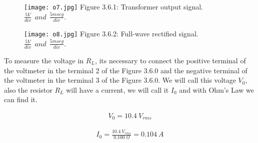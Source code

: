 \begin{multicols}{2}
\begin{figure}[H]
\texttt{[image: o7.jpg]}
\centering \linebreak \linebreak Figure 3.6.1: Transformer output signal.
\linebreak \linebreak $\frac{5 V}{div}\ \ and\ \ \frac{5mseg}{div}$.
\end{figure}

\begin{figure}[H]
\texttt{[image: o8.jpg]}
\centering \linebreak \linebreak Figure 3.6.2: Full-wave rectified signal.
\linebreak \linebreak $\frac{5 V}{div}\ \ and\ \ \frac{5mseg}{div}$.
\end{figure}
\end{multicols}

{\bfseries\itshape\color{OliveGreen}{Observation:}} {\bfseries\itshape\color{OliveGreen}{In the oscilloscope we are only using the channel 1 in D.C option.}}  \hfill \break

To measure the voltage in {\bfseries\itshape $R_{L}$}, its necessary to connect the positive terminal of the voltmeter in the terminal 2 of the Figure 3.6.0 and the negative terminal of the voltmeter in the terminal 3 of the Figure 3.6.0. We will call this voltage $V_{0}$, also the resistor $R_{L}$ will have a current, we will call it $I_{0}$ and with Ohm's Law we can find it.

\begin{ceqn}
\begin{align}
V_{0} = 10.4\ V_{rms} 
\end{align}
\end{ceqn} \hfill

{\bfseries\itshape\color{OliveGreen}{Observation:}} {\bfseries\itshape{}} \hfill \break \break

{\bfseries\itshape{}} \hfill \break

\begin{ceqn}
\begin{align}
I_{0} = \frac{10.4\ V_{rms}}{0.100\ \Omega} = 0.104\ A
\end{align}
\end{ceqn} \hfill 

